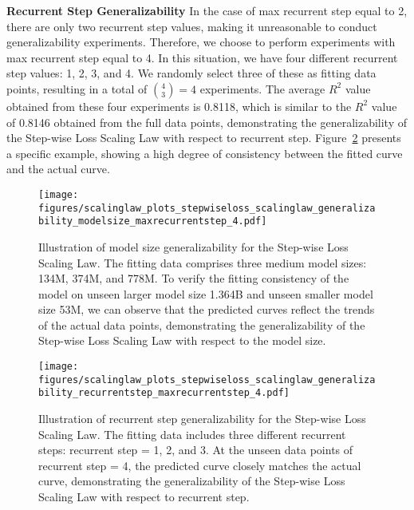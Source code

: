 \documentclass[]{bytedance_seed}
\newcommand{\1}{\mathbf{1}}
\begin{document}
\textbf{Recurrent Step Generalizability} In the case of max recurrent step equal to 2, there are only two recurrent step values, making it unreasonable to conduct generalizability experiments. Therefore, we choose to perform experiments with max recurrent step equal to 4. In this situation, we have four different recurrent step values: 1, 2, 3, and 4. We randomly select three of these as fitting data points, resulting in a total of $\binom{4}{3}=4$ experiments. The average $R^2$ value obtained from these four experiments is 0.8118, which is similar to the $R^2$ value of 0.8146 obtained from the full data points, demonstrating the generalizability of the Step-wise Loss Scaling Law with respect to recurrent step. Figure~\ref{fig:stepwiseloss_scalinglaw_generalizability_recurrentstep} presents a specific example, showing a high degree of consistency between the fitted curve and the actual curve.

\begin{figure}[htbp!]
    \centering
    \texttt{[image: figures/scalinglaw\_plots\_stepwiseloss\_scalinglaw\_generalizability\_modelsize\_maxrecurrentstep\_4.pdf]}
    \caption{Illustration of model size generalizability for the Step-wise Loss Scaling Law. The fitting data comprises three medium model sizes: 134M, 374M, and 778M. To verify the fitting consistency of the model on unseen larger model size 1.364B and unseen smaller model size 53M, we can observe that the predicted curves reflect the trends of the actual data points, demonstrating the generalizability of the Step-wise Loss Scaling Law with respect to the model size.}
    \label{fig:stepwiseloss_scalinglaw_generalizability_modelsize}
\end{figure}

\begin{figure}[htbp!]
    \centering
    \texttt{[image: figures/scalinglaw\_plots\_stepwiseloss\_scalinglaw\_generalizability\_recurrentstep\_maxrecurrentstep\_4.pdf]}
    \caption{Illustration of recurrent step generalizability for the Step-wise Loss Scaling Law. The fitting data includes three different recurrent steps: recurrent step = 1, 2, and 3. At the unseen data points of recurrent step = 4, the predicted curve closely matches the actual curve, demonstrating the generalizability of the Step-wise Loss Scaling Law with respect to recurrent step.}
    \label{fig:stepwiseloss_scalinglaw_generalizability_recurrentstep}
\end{figure}
\end{document}
